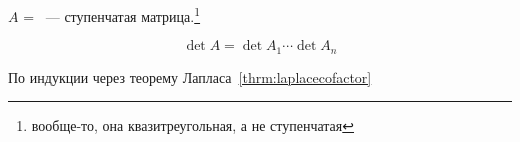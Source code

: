 \documentclass[12pt]{../../../notes}
\begin{document}
\begin{defn}\label{defn:stairsmtx}
  $A$ = ~--- ступенчатая 
  матрица.\footnote{вообще-то, она квазитреугольная, а не ступенчатая}
\end{defn}
\begin{thrm}\label{thrm:stairsdet}
  \[
    \det A = \det A_1 \dotsm \det A_n
  \]
\end{thrm}
\begin{ittproof}
  По индукции через теорему Лапласа~\ref{thrm:laplacecofactor}
\end{ittproof}
\end{document}

